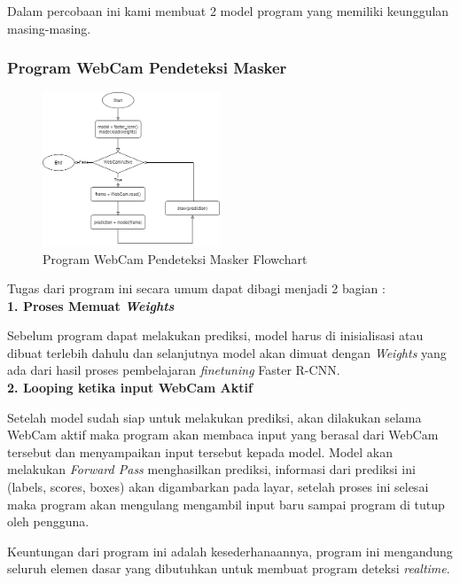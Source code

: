 \documentclass{article}
\begin{document}
	\par Dalam percobaan ini kami membuat 2 model program yang memiliki keunggulan masing-masing.
	\subsubsection{Program WebCam Pendeteksi Masker}
	\begin{figure}[H]
  		\centering
  		\includegraphics[width=200px]{arsitektur/Sequential Model.png}
  		\caption{Program WebCam Pendeteksi Masker Flowchart}
	\end{figure}
	Tugas dari program ini secara umum dapat dibagi menjadi 2 bagian : \\
	{\textbf{1. Proses Memuat \textit{Weights}}}
	\par Sebelum program dapat melakukan prediksi, model harus di inisialisasi atau dibuat terlebih dahulu dan selanjutnya model akan dimuat dengan \textit{Weights} yang ada dari hasil proses pembelajaran \textit{finetuning} Faster R-CNN.\\
	{\textbf{2. Looping ketika input WebCam Aktif}}
	\par Setelah model sudah siap untuk melakukan prediksi, akan dilakukan selama WebCam aktif maka program akan membaca input yang berasal dari WebCam tersebut dan menyampaikan input tersebut kepada model. Model akan melakukan \textit{Forward Pass} menghasilkan prediksi, informasi dari prediksi ini (labels, scores, boxes) akan digambarkan pada layar, setelah proses ini selesai maka program akan mengulang mengambil input baru sampai program di tutup oleh pengguna.\\
	\par Keuntungan dari program ini adalah kesederhanaannya, program ini mengandung seluruh elemen dasar yang dibutuhkan untuk membuat program deteksi \textit{realtime}.
\end{document}
